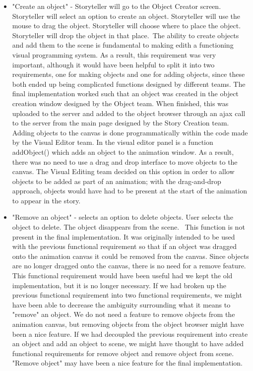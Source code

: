 \documentclass[12pt]{article}
\begin{document}
\begin{itemize}
\item "Create an object" - Storyteller will go to the Object Creator screen. Storyteller will select an option to create an object.  Storyteller will use the mouse to drag the object. Storyteller will choose where to place the object. Storyteller will drop the object in that place.\ The ability to create objects and add them to the scene is fundamental to making edith a functioning visual programming system. As a result, this requirement was very important, although it would have been helpful to split it into two requirements, one for making objects and one for adding objects, since these both ended up being complicated functions designed by different teams. The final implementation worked such that an object was created in the object creation window designed by the Object team. When finished, this was uploaded to the server and added to the object browser through an ajax call to the server from the main page designed by the Story Creation team. Adding objects to the canvas is done programmatically within the code made by the Visual Editor team. In the visual editor panel is a function addObject() which adds an object to the animation window. As a result, there was no need to use a drag and drop interface to move objects to the canvas. The Visual Editing team decided on this option in order to allow objects to be added as part of an animation; with the drag-and-drop approach, objects would have had to be present at the start of the animation to appear in the story.

\item "Remove an object" - selects an option to delete objects. User selects the object to delete. The object disappears  from the scene.
\ This function is not present in the final implementation. It was originally intended to be used with the previous functional requirement so that if an object was dragged onto the animation canvas it could be removed from the canvas. Since objects are no longer dragged onto the canvas, there is no need for a remove feature. This functional requirement would have been useful had we kept the old implementation, but it is no longer necessary. If we had broken up the previous functional requirement into two functional requirements, we might have been able to decrease the ambiguity surrounding what it means to "remove" an object. We do not need a feature to remove objects from the animation canvas, but removing objects from the object browser might have been a nice feature. If we had decoupled the previous requirement into create an object and add an object to scene, we might have thought to have added functional requirements for remove object and  remove object from scene. "Remove object" may have been a nice feature for the final implementation.


\end{itemize}
\end{document}
